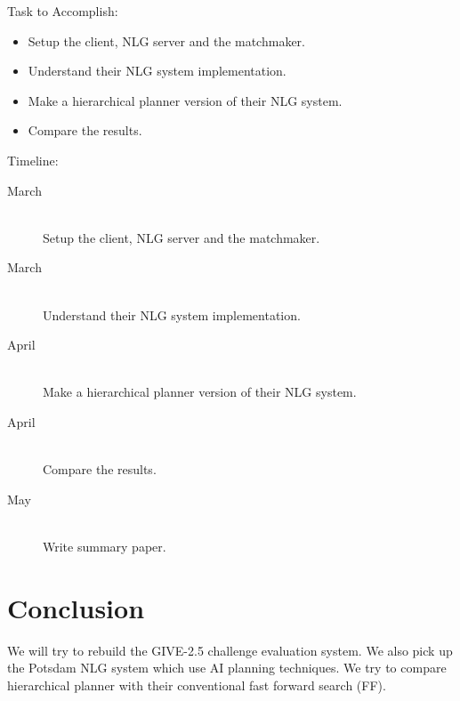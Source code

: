 \documentclass[11pt]{article} %
\begin{document}
Task to Accomplish:
\begin{itemize}
  \item Setup the client, NLG server and the matchmaker.
  \item Understand their NLG system implementation.
  \item Make a hierarchical planner version of their NLG system.
  \item Compare the results.
\end{itemize}


\noindent
Timeline:

\begin{description}
  \item[March] \hfill \\
   Setup the client, NLG server and the matchmaker.
  \item[March] \hfill \\
  Understand their NLG system implementation.
  \item[April] \hfill \\
  Make a hierarchical planner version of their NLG system.
  \item[April] \hfill \\
  Compare the results.
  \item[May] \hfill \\
  Write summary paper.
\end{description}

\section{Conclusion}
We will try to rebuild the GIVE-2.5 challenge evaluation system. We also pick up the Potsdam NLG system which use AI planning techniques. We try to compare hierarchical planner with their conventional fast forward search (FF). 




\end{document}
